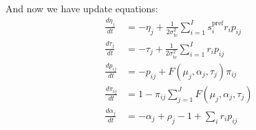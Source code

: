 \documentclass[12pt]{article}
\begin{document}
And now we have update equations: 
\begin{equation}
\begin{aligned}
\frac{d \eta_j}{dt} &= - \eta_j + \frac{1}{2 \sigma_{\text{tc}}^2} \sum_{i=1}^I s_i^{\text{pref}} r_i p_{ij}\\
\frac{d \tau_j}{dt} &= - \tau_j + \frac{1}{2 \sigma_{\text{tc}}^2} \sum_{i=1}^I r_i p_{ij}\\
\frac{d p_{ij}}{dt} &= - p_{ij} + F(\mu_j, \alpha_j, \tau_j) \pi_{ij}\\
\frac{d \pi_{ij}}{dt} &= 1 - \pi_{ij} \sum_{j=1}^J F(\mu_j, \alpha_j, \tau_j)\\
\frac{d \alpha_j}{dt} &= - \alpha_j + \rho_j - 1 + \sum_i r_i p_{ij}\\
\end{aligned}
\end{equation}
\iffalse
(Assume normalization is $\tau$ then we want to normalize all p terms by $\frac{1}{\tau}$. $\tau^{-1} = \prod C^{N_{ij}} = C^{\sum_j N_{ij}} = $ constant)
\fi
\end{document}
